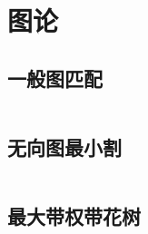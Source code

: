 \chapter{图论}
\section{一般图匹配}
\inputminted{cpp}{\source/graph-theory/general-matching.cpp}
\section{无向图最小割}
\inputminted{cpp}{\source/graph-theory/StoerWagner_O(V^3).cpp}
\section{最大带权带花树}
\inputminted{cpp}{\source/graph-theory/weighted_blossom.cpp}